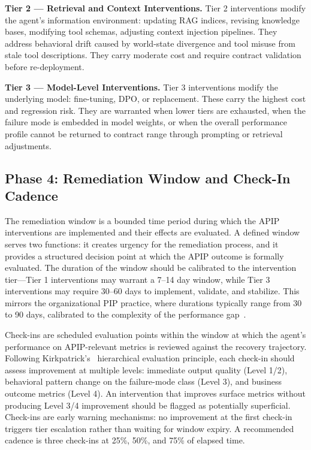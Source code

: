 \textbf{Tier 2 --- Retrieval and Context Interventions.} Tier 2 interventions
modify the agent's information environment: updating RAG indices, revising
knowledge bases, modifying tool schemas, adjusting context injection pipelines.
They address behavioral drift caused by world-state divergence and tool misuse
from stale tool descriptions. They carry moderate cost and require contract
validation before re-deployment.

\textbf{Tier 3 --- Model-Level Interventions.} Tier 3 interventions modify the
underlying model: fine-tuning, DPO, or replacement. These carry the highest
cost and regression risk. They are warranted when lower tiers are exhausted,
when the failure mode is embedded in model weights, or when the overall
performance profile cannot be returned to contract range through prompting or
retrieval adjustments.

\subsection{Phase 4: Remediation Window and Check-In Cadence}
\label{subsec:window}

The remediation window is a bounded time period during which the APIP
interventions are implemented and their effects are evaluated. A defined window
serves two functions: it creates urgency for the remediation process, and it
provides a structured decision point at which the APIP outcome is formally
evaluated. The duration of the window should be calibrated to the intervention
tier---Tier 1 interventions may warrant a 7--14 day window, while Tier 3
interventions may require 30--60 days to implement, validate, and stabilize.
This mirrors the organizational PIP practice, where durations typically range
from 30 to 90 days, calibrated to the complexity of the performance
gap~\cite{kirkpatrick2016four}.

Check-ins are scheduled evaluation points within the window at which the
agent's performance on APIP-relevant metrics is reviewed against the recovery
trajectory. Following Kirkpatrick's~\cite{kirkpatrick1994evaluating}
hierarchical evaluation principle, each check-in should assess improvement at
multiple levels: immediate output quality (Level 1/2), behavioral pattern
change on the failure-mode class (Level 3), and business outcome metrics
(Level 4). An intervention that improves surface metrics without producing
Level 3/4 improvement should be flagged as potentially superficial. Check-ins
are early warning mechanisms: no improvement at the first check-in triggers
tier escalation rather than waiting for window expiry. A recommended cadence is
three check-ins at 25\%, 50\%, and 75\% of elapsed time.

